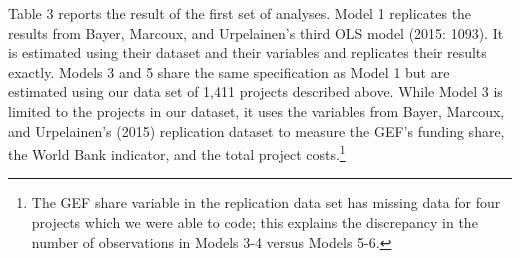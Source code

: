 \documentclass{article}
\begin{document}
Table 3 reports the result of the first set of analyses.  Model 1 replicates the results from Bayer, Marcoux, and Urpelainen’s third OLS model (2015: 1093).  It is estimated using their dataset and their variables and replicates their results exactly.  Models 3 and 5 share the same specification as Model 1 but are estimated using our data set of 1,411 projects described above.  While Model 3 is limited to the projects in our dataset, it uses the variables from Bayer, Marcoux, and Urpelainen’s (2015) replication dataset to measure the GEF’s funding share, the World Bank indicator, and the total project costs.\footnote{The GEF share variable in the replication data set has missing data for four projects which we were able to code; this explains the discrepancy in the number of observations in Models 3-4 versus Models 5-6.}
\end{document}
